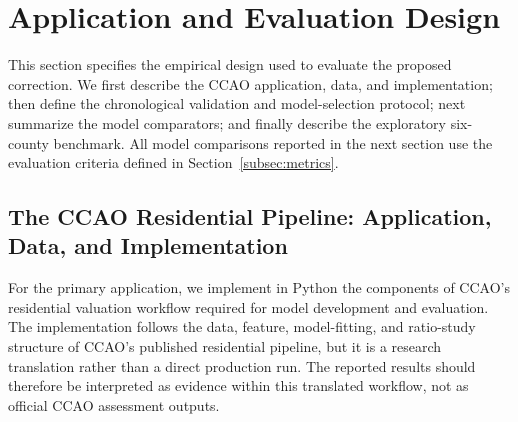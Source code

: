 \documentclass[10pt]{article}
\theoremstyle{definition}
\newcommand{\1}{\mathbf{1}}
\begin{document}
{{\section{Application and Evaluation Design}
\label{sec:empirical_design}

{This section specifies the empirical design used to evaluate the proposed correction. We first describe the CCAO application, data, and implementation; then define the chronological validation and model-selection protocol; next summarize the model comparators; and finally describe the exploratory six-county benchmark. All model comparisons reported in the next section use the evaluation criteria defined in Section~\ref{subsec:metrics}.}


\subsection{{The CCAO Residential Pipeline: Application, Data, and Implementation}}
\label{subsec:ccao_design}


{For the primary application, we implement in Python the components of CCAO's residential valuation workflow required for model development and evaluation. The implementation follows the data, feature, model-fitting, and ratio-study structure of CCAO's published residential pipeline, but it is a research translation rather than a direct production run. The reported results should therefore be interpreted as evidence within this translated workflow, not as official CCAO assessment outputs.}


}}
\end{document}
